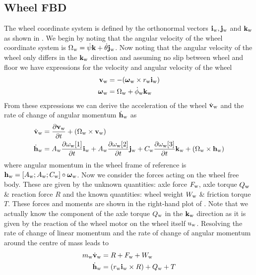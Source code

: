 \subsection{Wheel FBD}
The wheel coordinate system is defined by the orthonormal vectors $\mathbf{i}_{\text{w}},\mathbf{j}_{\text{w}}$ and $\mathbf{k}_{\text{w}}$ as shown in . We begin by noting that the angular velocity of the wheel coordinate system is $\Omega_{\text{w}} = \dot\psi\mathbf{k} + \dot\theta\mathbf{j}_{\text{w}}$. Now noting that the angular velocity of the wheel only differs in the $\mathbf{k}_{\text{w}}$ direction and assuming no slip between wheel and floor we have expressions for the velocity and angular velocity of the wheel
\begin{align*}
\mathbf{v}_{\text{w}} &= -(\boldsymbol{\omega}_{\text{w}}\times r_{\text{w}}\mathbf{i}_{\text{w}}) \\
\boldsymbol{\omega}_{\text{w}} &= \Omega_{\text{w}} + \dot\phi_{\text{w}}\mathbf{k}_{\text{w}}
\end{align*}
From these expressions we can derive the acceleration of the wheel $\dot{\mathbf{v}}_{\text{w}}$ and the rate of change of angular momentum $\dot{\mathbf{h}}_{\text{w}}$ as
\begin{align*}
\dot{\mathbf{v}}_{\text{w}} &= \frac{\mathrm{\partial} \mathbf{v}_{\text{w}}}{\mathrm{\partial} t} + (\Omega_{\text{w}}\times \mathbf{v}_{\text{w}}) \\
\dot{\mathbf{h}}_{\text{w}} &= A_{\text{w}}\frac{\mathrm{\partial} \omega_{\text{w}}[1]}{\mathrm{\partial} t}\mathbf{i}_{\text{w}} + A_{\text{w}}\frac{\mathrm{\partial} \omega_{\text{w}}[2]}{\mathrm{\partial} t}\mathbf{j}_{\text{w}} + C_{\text{w}}\frac{\mathrm{\partial} \omega_{\text{w}}[3]}{\mathrm{\partial} t}\mathbf{k}_{\text{w}} +  (\Omega_{\text{w}}\times \mathbf{h}_{\text{w}})
\end{align*}
where angular momentum in the wheel frame of reference is $\mathbf{h}_{\text{w}} = [A_{\text{w}}; A_{\text{w}}; C_{\text{w}}] \circ \boldsymbol{\omega}_{\text{w}}$.
Now we consider the forces acting on the wheel free body. These are given by the unknown quantities: axle force $F_{\text{w}}$, axle torque $Q_{\text{w}}$ \& reaction force $R$ and the known quantities: wheel weight $W_{\text{w}}$ \& friction torque $T$. These forces and moments are shown in the right-hand plot of . Note that we actually know the component of the axle torque $Q_{\text{w}}$ in the $\mathbf{k}_{\text{w}}$ direction as it is given by the reaction of the wheel motor on the wheel itself $u_{\text{w}}$. Resolving the rate of change of linear momentum and the rate of change of angular momentum around the centre of mass leads to 
\begin{align}
m_{\text{w}}\dot{\mathbf{v}}_{\text{w}} &= R + F_{\text{w}} + W_{\text{w}} \label{eqn:wFBD1} \\
\dot{\mathbf{h}}_{\text{w}} &= (r_{\text{w}}\mathbf{i}_{\text{w}} \times R) + Q_{\text{w}} + T \label{eqn:wFBD2} 
\end{align}





